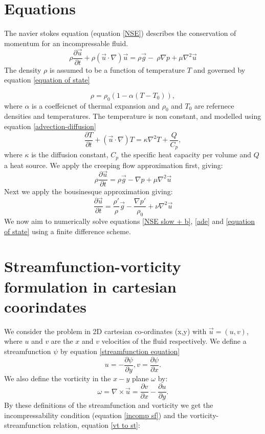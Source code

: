 \documentclass{article}
\begin{document}
\section*{Equations}
The navier stokes equation (equation \ref{NSE}) describes the conservation of momentum for an incompressable fluid.
\begin{equation}
	\rho \frac{\partial \vec{u}}{\partial t} + \rho (\vec{u} \cdot \nabla) \vec{u} = \rho \vec{g} - \ \rho {\nabla p} + \mu \nabla^2 \vec{u}
	\label{NSE}
\end{equation}
The density $\rho$ is assumed to be a function of temperature $T$ and governed by equation \ref{equation of state}

\begin{equation}
	\rho = \rho_0 (1- \alpha (T - T_0)),
	\label{equation of state}
\end{equation}
where $\alpha$ is a coeffeicnet of thermal expansion and $\rho_0$ and $T_0$ are refernece densities and temperatures. The temperature is non constant, and modelled using equation \ref{advection-diffusion}
\begin{equation}
	\frac{\partial T}{\partial t} + (\vec{u} \cdot \nabla) T = \kappa \nabla^2 T + \frac{Q}{C_p},
	\label{ade}
\end{equation}
where $\kappa$ is the diffusion constant, $C_p$ the specific heat capacity per volume and $Q$ a heat source.
\newline
We apply the creeping flow approximation first, giving:
\begin{equation}
	\rho \frac{\partial \vec{u}}{\partial t} = \rho \vec{g} - {\nabla p} + \mu \nabla^2 \vec{u}
	\label{NSE slow}
\end{equation}
Next we apply the bousinesque approximation giving:
\begin{equation}
	\frac{\partial \vec{u}}{\partial t} = \frac{\rho'}{\rho} \vec{g} -   \frac{\nabla p'}{\rho_0} + \nu \nabla^2 \vec{u}
	\label{NSE slow + b}
\end{equation}
We now aim to numerically solve equations \ref{NSE slow + b}, \ref{ade} and \ref{equation of state} using a finite difference scheme.

\section*{Streamfunction-vorticity formulation in cartesian coorindates}
We consider the problem in 2D cartesian co-ordinates (x,y) with $\vec{u}=(u,v)$, where $u$ and $v$ are the $x$ and $v$ velocities of the fluid respectively. We define a streamfunction $\psi$ by equation \ref{streamfunction equation}
\begin{equation}
	u = - \frac{\partial \psi}{\partial y}, v = \frac{\partial \psi}{\partial x}.
\end{equation}
We also define the vorticity in the $x-y$ plane $\omega$ by:
\begin{equation}
	\omega = \nabla \times \vec{u} = \frac{\partial v}{\partial x} - \frac{\partial u}{\partial y}.
\end{equation}
By these definitions of the streamfunction and vorticity we get the incompressability condition (equation \ref{incomp sf}) and the vorticity-streamfunction relation, equation \ref{vt to st}:
\end{document}
